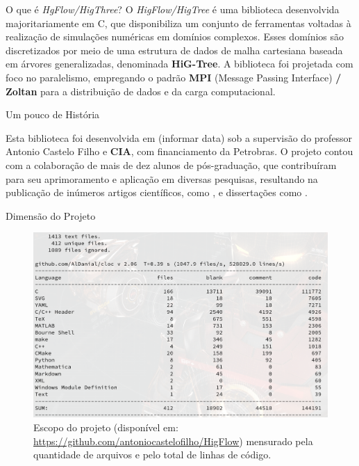 \documentclass[aspectratio=169,t,xcolor=table]{beamer}
\begin{document}
\begin{frame}{}
	\smaller
	\begin{block}{O que é \textit{HgFlow/HigThree}?}
		\vspace{0.25 cm}
		O \textit{HigFlow/HigTree} é uma biblioteca desenvolvida majoritariamente em C, que disponibiliza um conjunto de ferramentas voltadas à realização de simulações numéricas em domínios complexos. Esses domínios são discretizados por meio de uma estrutura de dados de malha cartesiana baseada em árvores generalizadas, denominada \textbf{HiG-Tree}. A biblioteca foi projetada com foco no paralelismo, empregando o padrão \textbf{MPI} (Message Passing Interface)\textbf{ / Zoltan} para a distribuição de dados e da carga computacional.
	\end{block}
	
	\begin{block}{Um pouco de História}
		\vspace{0.25 cm}
		
		Esta biblioteca foi desenvolvida em (informar data) sob a supervisão do professor Antonio Castelo Filho e \textbf{CIA}, com financiamento da Petrobras. O projeto contou com a colaboração de mais de dez alunos de pós-graduação, que contribuíram para seu aprimoramento e aplicação em diversas pesquisas, resultando na publicação de inúmeros artigos científicos, como  \citeauthor{Sousa2019}, \citeauthor{CastilloSanchez2023} e dissertações como \citeauthor{raymundo}.
	\end{block}
\end{frame}

\begin{frame}{\smaller \smaller Dimensão do Projeto}
	
	\begin{figure}
		\vspace{-0.3cm}
		\centering
		\caption{\smaller Escopo do projeto (disponível em: \url{https://github.com/antoniocastelofilho/HigFlow}) mensurado pela quantidade de arquivos e pelo total de linhas de código.}
		\includegraphics[height=0.7\textheight]{imgs/dimencao_do_projeto.png}
	\end{figure}
\end{frame}
\end{document}

